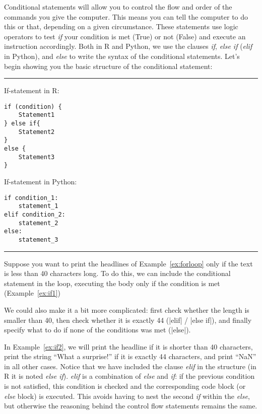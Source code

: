 Conditional statements will allow you to control the flow and order of
the commands you give the computer. This means you can tell the
computer to do this or that, depending on a given circumstance. These
statements use logic operators to test \emph{if} your condition is met
(True) or not (False) and execute an instruction accordingly. Both in
R and Python, we use the clauses \emph{if}, \emph{else if}
(\emph{elif} in Python), and \emph{else} to write the syntax of the
conditional statements. Let's begin showing you the basic structure of
the conditional statement:

\noindent\rule{\textwidth}{.5pt}\vspace{-1em}

\noindent\begin{minipage}[t]{.45\textwidth}
  If-statement in R:
\begin{verbatim}
if (condition) {
    Statement1
} else if{
    Statement2
}
else {
    Statement3
}
\end{verbatim}
\end{minipage}
\begin{minipage}[t]{.45\textwidth}
  If-statement in Python:
\begin{verbatim}
if condition_1:
    statement_1
elif condition_2:
    statement_2
else:
    statement_3
\end{verbatim}
\end{minipage}
\vspace{.5em}

\noindent\rule{\textwidth}{.5pt}


Suppose you want to print the headlines of Example~\ref{ex:forloop} only if the text is less than 40 characters long.
To do this, we can include the conditional statement in the loop, executing the body only if the condition is met (Example~\ref{ex:if1})


We could also make it a bit more complicated: first check whether the length is smaller than 40, then check whether it is exactly 44 (|elif| / |else if|), and finally specify what to do if none of the conditions was met (|else|).

In Example~\ref{ex:if2}, we will print the headline if it is shorter than 40 characters, print the string ``What a surprise!'' if it is exactly 44 characters, and print ``NaN'' in all other cases. 
Notice that we have included the clause \emph{elif} in the structure (in R it is noted \emph{else if}).  \emph{elif} is a combination of \emph{else} and \emph{if}: if the previous condition is not satisfied, this condition is checked and the corresponding code block (or \emph{else} block) is executed. This avoids having to nest the second \emph{if} within the \emph{else}, but otherwise the reasoning behind the control flow statements remains the same.



